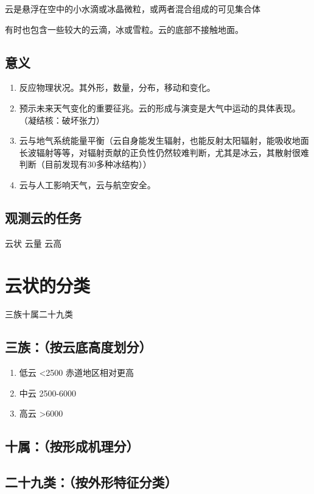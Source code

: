 \documentclass[UTF8,11pt]{ctexbook}
\begin{document}
云是悬浮在空中的小水滴或冰晶微粒，或两者混合组成的可见集合体

有时也包含一些较大的云滴，冰或雪粒。云的底部不接触地面。

\subsection{意义}
\begin{enumerate}
    \item 反应物理状况。其外形，数量，分布，移动和变化。
    \item 预示未来天气变化的重要征兆。云的形成与演变是大气中运动的具体表现。（凝结核：破坏张力）
    \item 云与地气系统能量平衡（云自身能发生辐射，也能反射太阳辐射，能吸收地面长波辐射等等，对辐射贡献的正负性仍然较难判断，尤其是冰云，其散射很难判断（目前发现有30多种冰结构））
    \item 云与人工影响天气，云与航空安全。
\end{enumerate}

\subsection{观测云的任务}

云状 云量 云高


\section{云状的分类}

三族十属二十九类
\subsection{三族：（按云底高度划分）}
\begin{enumerate}
    \item 低云 	<2500		赤道地区相对更高
    \item 中云 	2500-6000	
    \item 高云	>6000	
\end{enumerate}

\subsection{十属：（按形成机理分）}

\subsection{二十九类：（按外形特征分类）}
\end{document}
